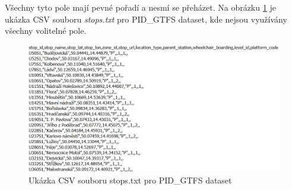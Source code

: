 Všechny tyto pole mají pevné pořadí a nesmí se přeházet. Na obrázku \ref{fig:stops} je ukázka CSV souboru \textit{stops.txt}
pro PID\_GTFS dataset, kde nejsou využívány všechny volitelné pole.

\begin{figure}[H] \centering
    \includegraphics[width=400pt]{./pictures/stops.PNG}
    \caption[Ukázka CSV souboru stops.txt pro PID\_GTFS dataset]{Ukázka CSV souboru stops.txt pro PID\_GTFS dataset}
	\label{fig:stops}              
\end{figure} 